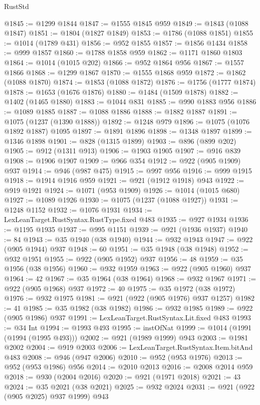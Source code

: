 \begin{lexlean}{RustStd}
\begin{coremodule}
@1845 := @1299 @1844
@1847 := @1555 @1845 @959
@1849 := @1843 (@1088 @1847)
@1851 := @1804 (@1827 @1849)
@1853 := @1786 (@1088 @1851)
@1855 := @1014 (@1789 @431)
@1856 := @952 @1855
@1857 := @1856 @1434
@1858 := @999 @1857
@1860 := @1788 @1858 @959
@1862 := @1171 @1860 @1803
@1864 := @1014 (@1015 @202)
@1866 := @952 @1864 @956
@1867 := @1557 @1866
@1868 := @1299 @1867
@1870 := @1555 @1868 @959
@1872 := @1862 (@1088 @1870)
@1874 := @1853 (@1088 @1872)
@1876 := @1756 (@1777 @1874)
@1878 := @1653 (@1676 @1876)
@1880 := @1484 (@1509 @1878)
@1882 := @1402 (@1465 @1880)
@1883 := @1044 @831
@1885 := @990 @1883 @956
@1886 := @1089 @1885
@1887 := @1088 @1886
@1888 := @1882 @1887
@1891 := @1075 (@1237 (@1390 @1888))
@1892 := @1248 @979
@1896 := @1075 (@1076 @1892 @1887) @1095
@1897 := @1891 @1896
@1898 := @1348 @1897
@1899 := @1346 @1898
@1901 := @828 (@1315 @1899)
@1903 := @896 (@899 @202)
@1905 := @912 (@1311 @913)
@1906 := @1903 @1905
@1907 := @916 @839
@1908 := @1906 @1907
@1909 := @966 @354
@1912 := @922 (@905 @1909) @937
@1914 := @946 (@987 @475)
@1915 := @997 @956
@1916 := @999 @1915
@1918 := @1914 @1916 @959
@1921 := @921 (@1912 @1918) @943
@1922 := @919 @1921
@1924 := @1071 (@953 @1909)
@1926 := @1014 (@1015 @680)
@1927 := @1089 @1926
@1930 := @1075 (@1237 (@1088 @1927))
@1931 := @1248 @1152
@1932 := @1076 @1931
@1934 := LexLeanTarget.RustSyntax.RustType.fixed @483
@1935 := @927 @1934
@1936 := @1195 @1935
@1937 := @995 @1151
@1939 := @921 (@1936 @1937)
@1940 := 84
@1943 := @35 @1940 (@38 @1940)
@1944 := @932 @1943
@1947 := @922 (@905 @1944) @937
@1948 := 60
@1951 := @35 @1948 (@38 @1948)
@1952 := @932 @1951
@1955 := @922 (@905 @1952) @937
@1956 := 48
@1959 := @35 @1956 (@38 @1956)
@1960 := @932 @1959
@1963 := @922 (@905 @1960) @937
@1964 := 42
@1967 := @35 @1964 (@38 @1964)
@1968 := @932 @1967
@1971 := @922 (@905 @1968) @937
@1972 := 40
@1975 := @35 @1972 (@38 @1972)
@1976 := @932 @1975
@1981 := @921 (@922 (@905 @1976) @937 @1257)
@1982 := 41
@1985 := @35 @1982 (@38 @1982)
@1986 := @932 @1985
@1989 := @922 (@905 @1986) @937
@1991 := LexLeanTarget.RustSyntax.Lit.fixed @483
@1993 := @34 Int
@1994 := @1993 @493
@1995 := instOfNat
@1999 := @1014 (@1991 (@1994 (@1995 @493)))
@2002 := @921 (@1989 @1999) @943
@2003 := @1981 @2002
@2004 := @919 @2003
@2006 := LexLeanTarget.RustSyntax.Item.bitAnd @483
@2008 := @946 (@947 @2006)
@2010 := @952 (@953 @1976)
@2013 := @952 (@953 @1986) @956
@2014 := @2010 @2013
@2016 := @2008 @2014 @959
@2018 := @930 (@2004 @2016)
@2020 := @921 (@1971 @2018)
@2021 := 43
@2024 := @35 @2021 (@38 @2021)
@2025 := @932 @2024
@2031 := @921 (@922 (@905 @2025) @937 @1999) @943

\end{coremodule}
\end{lexlean}
